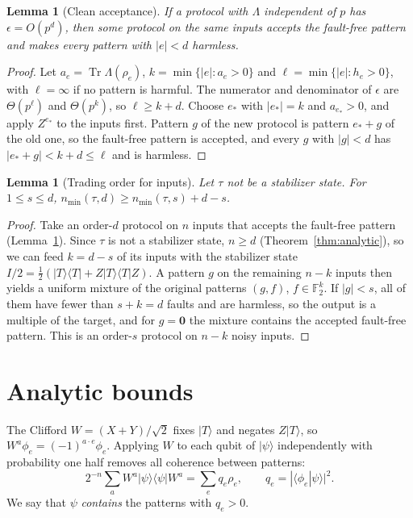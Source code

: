 \documentclass[aps,prl,reprint,twocolumn,amsmath,amssymb,floatfix,nofootinbib,superscriptaddress]{revtex4-2}
\newtheorem{lemma}[theorem]{Lemma}
\newcommand{\F}{\mathbb F_2}
\newcommand{\tr}{\operatorname{Tr}}
\begin{document}
\begin{lemma}[Clean acceptance]\label{lem:clean}
If a protocol with $\Lambda$ independent of $p$ has $\epsilon=O(p^d)$, then some protocol on the same inputs accepts the fault-free pattern and makes every pattern with $|e|<d$ harmless.
\end{lemma}
\begin{proof}
Let $a_e=\tr\Lambda(\rho_e)$, $k=\min\{|e|:a_e>0\}$ and $\ell=\min\{|e|:h_e>0\}$, with $\ell=\infty$ if no pattern is harmful. The numerator and denominator of $\epsilon$ are $\Theta(p^\ell)$ and $\Theta(p^k)$, so $\ell\geq k+d$. Choose $e_*$ with $|e_*|=k$ and $a_{e_*}>0$, and apply $Z^{e_*}$ to the inputs first. Pattern $g$ of the new protocol is pattern $e_*+g$ of the old one, so the fault-free pattern is accepted, and every $g$ with $|g|<d$ has $|e_*+g|<k+d\leq\ell$ and is harmless.
\end{proof}

\begin{lemma}[Trading order for inputs]\label{lem:trade}
Let $\tau$ not be a stabilizer state. For $1\leq s\leq d$, $n_{\min}(\tau,d)\geq n_{\min}(\tau,s)+d-s$.
\end{lemma}
\begin{proof}
Take an order-$d$ protocol on $n$ inputs that accepts the fault-free pattern (Lemma~\ref{lem:clean}). Since $\tau$ is not a stabilizer state, $n\geq d$ (Theorem~\ref{thm:analytic}), so we can feed $k=d-s$ of its inputs with the stabilizer state $I/2=\tfrac12(|T\rangle\langle T|+Z|T\rangle\langle T|Z)$. A pattern $g$ on the remaining $n-k$ inputs then yields a uniform mixture of the original patterns $(g,f)$, $f\in\F^k$. If $|g|<s$, all of them have fewer than $s+k=d$ faults and are harmless, so the output is a multiple of the target, and for $g=\mathbf0$ the mixture contains the accepted fault-free pattern. This is an order-$s$ protocol on $n-k$ noisy inputs.
\end{proof}

\section{Analytic bounds}\label{app:analytic}
The Clifford $W=(X+Y)/\sqrt2$ fixes $|T\rangle$ and negates $Z|T\rangle$, so $W^a\phi_e=(-1)^{a\cdot e}\phi_e$. Applying $W$ to each qubit of $|\psi\rangle$ independently with probability one half removes all coherence between patterns:
\begin{equation}
 2^{-n}\textstyle\sum_aW^a|\psi\rangle\langle\psi|W^a=\sum_eq_e\rho_e,\qquad q_e=|\langle\phi_e|\psi\rangle|^2.
 \label{eq:twirl}
\end{equation}
We say that $\psi$ \emph{contains} the patterns with $q_e>0$.
\end{document}
